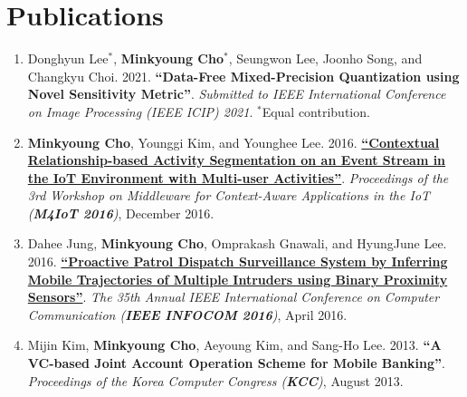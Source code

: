 \documentclass[letterpaper,oneside,11pt]{article}
\begin{document}
\section{Publications}
\begin{enumerate}[leftmargin=*, itemsep=0em]
  \item \small Donghyun Lee$^\ast$, \textbf{Minkyoung Cho$^\ast$}, Seungwon Lee, Joonho Song, and Changkyu Choi. 2021. \textbf{{``Data-Free Mixed-Precision Quantization using Novel Sensitivity Metric''}}. \textit{Submitted to IEEE International Conference on Image Processing (IEEE ICIP) 2021}. $^\ast$Equal contribution.
  \item \small \textbf{Minkyoung Cho}, Younggi Kim, and Younghee Lee. 2016. \textbf{\href{https://dl.acm.org/doi/10.1145/3008631.3008633}{``Contextual Relationship-based Activity Segmentation on an Event Stream in the IoT Environment with Multi-user Activities''}}. \textit{Proceedings of the 3rd Workshop on Middleware for Context-Aware Applications in the IoT (\textbf{M4IoT 2016})}, December 2016.
  \item \small Dahee Jung, \textbf{Minkyoung Cho}, Omprakash Gnawali, and HyungJune Lee. 2016. \textbf{\href{https://ieeexplore.ieee.org/abstract/document/7524369}{``Proactive Patrol Dispatch Surveillance System by Inferring Mobile Trajectories of Multiple Intruders using Binary Proximity Sensors''}}. \textit{The 35th Annual IEEE International Conference on Computer Communication (\textbf{IEEE INFOCOM 2016})}, April 2016.
  \item \small Mijin Kim, \textbf{Minkyoung Cho}, Aeyoung Kim, and Sang-Ho Lee. 2013. \textbf{``A VC-based Joint Account Operation Scheme for Mobile Banking''}. \textit{Proceedings of the Korea Computer Congress (\textbf{KCC})}, August 2013.
\end{enumerate}

\end{document}

